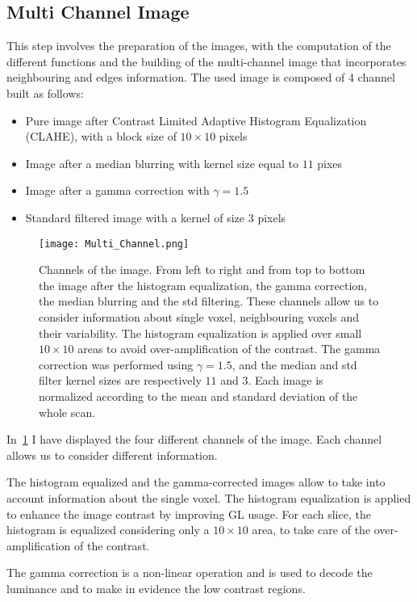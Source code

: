 \documentclass{standalone}
\begin{document}
	\subsection*{Multi Channel Image}
	
	This step involves the preparation of the images, with the computation of the different functions and the building of the multi-channel image that incorporates neighbouring and edges information. The used image is composed of 4 channel built as follows:  
	\begin{itemize}
		\item Pure image after Contrast Limited Adaptive Histogram Equalization (CLAHE), with a block size of  $10\times 10$ pixels
		\item Image after a median blurring with kernel size equal to $11$ pixes
		\item Image after a gamma correction with $\gamma = 1.5$
		\item Standard filtered image with a kernel of size $3$ pixels
	\end{itemize}
	
	\begin{figure}[h]
		\centering
			\texttt{[image: Multi\_Channel.png]}
			\caption{Channels of the image. From left to right and from top to bottom the image after the histogram equalization, the gamma correction, the median blurring and the std filtering. These channels allow us to consider information about single voxel, neighbouring voxels and their variability. The histogram equalization is applied over small $10\times 10$ areas to avoid over-amplification of the contrast. The gamma correction was performed using $\gamma = 1.5$, and the median and std filter kernel sizes are respectively $11$ and $3$. Each image is normalized according to the mean and standard deviation of the whole scan. }\label{fig:MultiChannel}
		\end{figure}
	
	In \figurename\,\ref{fig:MultiChannel} I have displayed the four different channels of the image. Each channel allows us to consider different information.

	The histogram equalized and the gamma-corrected images allow to take into account information about the single voxel. The histogram equalization is applied to enhance the image contrast by improving GL usage. For each slice, the histogram is equalized considering only a $10\times 10$ area, to take care of the over-amplification of the contrast.

	The gamma correction is a non-linear operation and is used to decode the luminance and to make in evidence the low contrast regions. 
\end{document}

